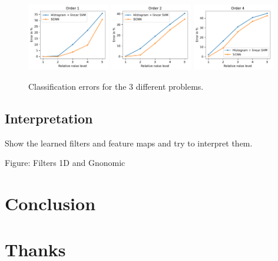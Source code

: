 \documentclass[final,twocolumn,3p,times,authoryear]{elsarticle}
\newcommand{\nati}[1]{{\color[rgb]{.1,.6,.1}{#1}}}
\newcommand{\assign}[1]{{\color[rgb]{.8,.5,.8}{Assigned: #1 }}}
\newcommand{\1}{\b{1}}              %
\newcommand{\0}{\b{0}}              %
\begin{document}
\begin{figure}[!ht]
\centering
\includegraphics[width=0.32\textwidth]{figures/result_order1.pdf}
\includegraphics[width=0.32\textwidth]{figures/result_order2.pdf}
\includegraphics[width=0.32\textwidth]{figures/result_order4.pdf}
\caption{Classification errors for the 3 different problems. \nati{TODO: order is not correct} }
\label{fig:results}
\end{figure}




\subsection{Interpretation}
\assign{Nathanaël, Tomek, Michaël}

Show the learned filters and feature maps and try to interpret them.

Figure: Filters 1D and Gnonomic

\section{Conclusion}
\assign{Nathanaël, Tomek, Michaël}

\section*{Thanks}

\appendix
\end{document}
